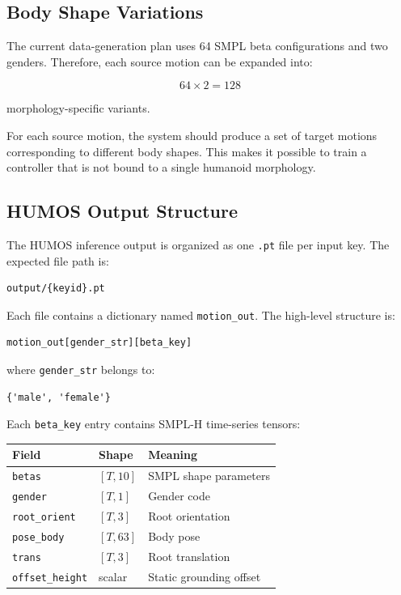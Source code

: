\documentclass[11pt,a4paper]{article}
\begin{document}
\subsection{Body Shape Variations}

The current data-generation plan uses 64 SMPL beta configurations and two genders. Therefore, each source motion can be expanded into:

\begin{equation}
    64 \times 2 = 128
\end{equation}

morphology-specific variants.

For each source motion, the system should produce a set of target motions corresponding to different body shapes. This makes it possible to train a controller that is not bound to a single humanoid morphology.

\subsection{HUMOS Output Structure}

The HUMOS inference output is organized as one \texttt{.pt} file per input key. The expected file path is:

\begin{lstlisting}
output/{keyid}.pt
\end{lstlisting}

Each file contains a dictionary named \texttt{motion\_out}. The high-level structure is:

\begin{lstlisting}
motion_out[gender_str][beta_key]
\end{lstlisting}

where \texttt{gender\_str} belongs to:

\begin{lstlisting}
{'male', 'female'}
\end{lstlisting}

Each \texttt{beta\_key} entry contains SMPL-H time-series tensors:

\begin{center}
    \begin{tabular}{lll}
        \toprule
        Field                   & Shape    & Meaning                 \\
        \midrule
        \texttt{betas}          & $[T,10]$ & SMPL shape parameters   \\
        \texttt{gender}         & $[T,1]$  & Gender code             \\
        \texttt{root\_orient}   & $[T,3]$  & Root orientation        \\
        \texttt{pose\_body}     & $[T,63]$ & Body pose               \\
        \texttt{trans}          & $[T,3]$  & Root translation        \\
        \texttt{offset\_height} & scalar   & Static grounding offset \\
        \bottomrule
    \end{tabular}
\end{center}
\end{document}
